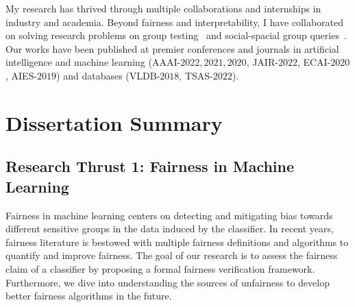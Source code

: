 \documentclass{article}
\begin{document}
	
	My research has thrived through multiple collaborations and internships in industry and academia. Beyond fairness and interpretability, I have collaborated on solving research problems on  group testing~\cite{ciampiconi2020maxsat} and social-spacial group queries~\cite{ghosh2018flexible,apon2021social}. Our works have been published at premier conferences and journals in artificial intelligence and machine learning (AAAI-$ 2022, 2021, 2020 $, JAIR-$ 2022 $, ECAI-$ 2020 $, AIES-$ 2019 $) and databases (VLDB-$ 2018 $, TSAS-$ 2022 $).
	
	
	
	
	
	\section*{Dissertation Summary}
	
	\subsection*{Research Thrust 1: Fairness in Machine Learning}
	
	Fairness in machine learning centers on detecting and mitigating bias towards different sensitive groups in the data induced by the classifier. In recent years, fairness literature is bestowed with multiple fairness definitions and algorithms to quantify and improve fairness. The goal of our research is to assess the fairness claim of a classifier by proposing a formal fairness verification framework. Furthermore, we dive into understanding the sources of unfairness to develop better fairness algorithms in the future.
	
\end{document}
